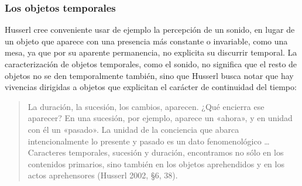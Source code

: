 \subsubsection{Los objetos temporales}\label{sec:objetos-temporales}

Husserl cree conveniente usar de ejemplo la percepción de un sonido, en
lugar de un objeto que aparece con una presencia más constante o
invariable, como una mesa, ya que por su aparente permanencia, no
explicita su discurrir temporal. La caracterización de objetos
temporales, como el sonido, no significa que el resto de objetos no se
den temporalmente también, sino que Husserl busca notar que hay
vivencias dirigidas a objetos que explicitan el carácter de continuidad
del tiempo:

\begin{quote}
La duración, la sucesión, los cambios, aparecen. ¿Qué encierra ese
aparecer? En una sucesión, por ejemplo, aparece un «ahora», y en unidad
con él un «pasado». La unidad de la conciencia que abarca
intencionalmente lo presente y pasado es un dato fenomenológico
\ldots Caracteres temporales, sucesión y duración, encontramos no
sólo en los contenidos primarios, sino también en los objetos
aprehendidos y en los actos aprehensores (Husserl 2002, §6, 38).
\end{quote}

